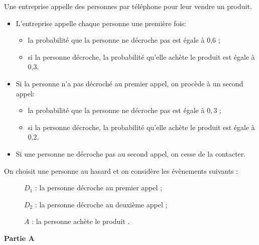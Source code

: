 
\medskip

Une entreprise appelle des personnes par téléphone pour leur vendre un produit. 

\begin{itemize}
\item L'entreprise appelle chaque personne une première fois:
\begin{itemize}
\item[$\bullet~~$]la probabilité que la personne ne décroche pas est égale à 0,6 ;
\item[$\bullet~~$]si la personne décroche, la probabilité qu'elle achète le produit est égale à 0,3.
\end{itemize}
\item Si la personne n'a pas décroché au premier appel, on procède à un second appel: 
\begin{itemize}
\item[$\bullet~~$]la probabilité que la personne ne décroche pas est égale à $0,3$ ;
\item[$\bullet~~$]si la personne décroche, la probabilité qu'elle achète le produit est égale à 0,2.
\end{itemize}
\item Si une personne ne décroche pas au second appel, on cesse de la contacter.
\end{itemize}

\medskip

On choisit une personne au hasard et on considère les évènements suivants : 

\begin{description}
\item[ ] $D_1$ : \og la personne décroche au premier appel\fg{} ;
\item[ ] $D_2$ : \og la personne décroche au deuxième appel\fg{} ;
\item[ ] $A$ : \og la personne achète le produit \fg.
\end{description}


\bigskip

\textbf{Partie A}

